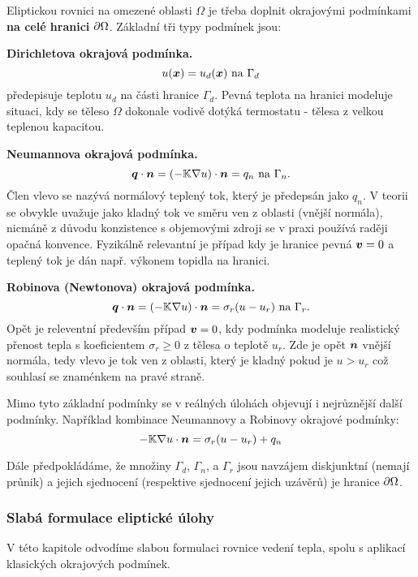 Eliptickou rovnici na omezené oblasti $\Omega$ je třeba doplnit okrajovými podmínkami 
{\bf na celé hranici} $\partial \Omega$. Základní tři typy podmínek jsou:

{\bf Dirichletova okrajová podmínka.} 
\[
    u(\mathbf{\boldsymbol{x}}) = u_d(\mathbf{\boldsymbol{x}})\text{ na }\Gamma_d
\]
předepisuje teplotu $u_d$ na části hranice $\Gamma_d$. Pevná teplota na hranici modeluje situaci, kdy se těleso $\Omega$ dokonale vodivě dotýká termostatu - 
tělesa z velkou teplenou kapacitou.

{\bf Neumannova okrajová podmínka.}
\[
    \mathbf{\boldsymbol{q}} \cdot \mathbf{\boldsymbol{n}} = (-{\mathbb{K}} \nabla u) \cdot \mathbf{\boldsymbol{n}} = q_n\text{ na }\Gamma_n.
\]
Člen vlevo se nazývá normálový teplený tok, který je předepsán jako $q_n$. V teorii se obvykle uvažuje jako kladný tok ve směru ven z oblasti (vnější normála), 
nicmáně z důvodu konzistence s objemovými zdroji se v praxi používá raději opačná konvence. Fyzikálně relevantní je případ kdy je hranice pevná 
$\mathbf{\boldsymbol{v}} = 0$ a teplený tok je dán např. výkonem topidla na hranici. 

{\bf Robinova (Newtonova) okrajová podmínka.}
\[
     \mathbf{\boldsymbol{q}} \cdot \mathbf{\boldsymbol{n}} = (-{\mathbb{K}} \nabla u)  \cdot \mathbf{\boldsymbol{n}} = \sigma_r(u - u_r)\text{ na }\Gamma_r. 
\]
Opět je releventní především případ $\mathbf{\boldsymbol{v}} =0$, kdy podmínka modeluje realistický přenost tepla s koeficientem $\sigma_r\ge 0$ z tělesa o teplotě $u_r$.
Zde je opět $\mathbf{\boldsymbol{n}}$ vnější normála, tedy vlevo je tok ven z oblasti, který je kladný pokud je $u > u_r$ což souhlasí se znaménkem na pravé straně.

Mimo tyto základní podmínky se v reálných úlohách objevují i nejrůznější další podmínky. 
Například kombinace Neumannovy a Robinovy okrajové podmínky:
\[
    -{\mathbb{K}} \nabla u \cdot \mathbf{\boldsymbol{n}} = \sigma_r(u - u_r) + q_n
\]

Dále předpokládáme, že množiny $\Gamma_d$, $\Gamma_n$, a $\Gamma_r$ jsou navzájem diskjunktní (nemají průnik) a jejich sjednocení (respektive sjednocení jejich uzávěrů)
je hranice $\partial \Omega$.


\subsubsection{Slabá formulace eliptické úlohy}
\label{sec:weak_form_elliptic_eq}

V této kapitole odvodíme slabou formulaci rovnice vedení tepla, 
spolu s aplikací klasických okrajových podmínek.

